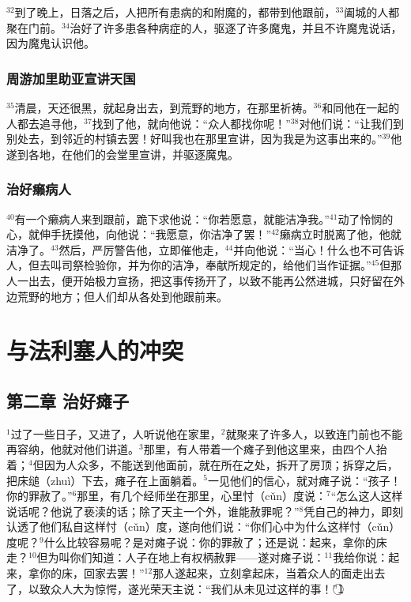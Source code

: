 $^{32}$到了晚上，日落之后，人把所有患病的和附魔的，都带到他跟前，$^{33}$阖城的人都聚在门前。$^{34}$\UL[耶稣]治好了许多患各种病症的人，驱逐了许多魔鬼，并且不许魔鬼说话，因为魔鬼认识他。


\subsubsection{周游加里助亚宣讲天国}
$^{35}$清晨，天还很黑，\UL[耶稣]就起身出去，到荒野的地方，在那里祈祷。$^{36}$\UL[西满]和同他在一起的人都去追寻他，$^{37}$找到了他，就向他说：“众人都找你呢！”$^{38}$\UL[耶稣]对他们说：“让我们到别处去，到邻近的村镇去罢！好叫我也在那里宣讲，因为我是为这事出来的。”$^{39}$他遂到\UL[加里肋亚]各地，在他们的会堂里宣讲，并驱逐魔鬼。


\subsubsection{治好癞病人}
$^{40}$有一个癞病人来到\UL[耶稣]跟前，跪下求他说：“你若愿意，就能洁净我。”$^{41}$\UL[耶稣]动了怜悯的心，就伸手抚摸他，向他说：“我愿意，你洁净了罢！”$^{42}$癞病立时脱离了他，他就洁净了。$^{43}$然后，\UL[耶稣]严厉警告他，立即催他走，$^{44}$并向他说：“当心！什么也不可告诉人，但去叫司祭检验你，并为你的洁净，奉献\UL[梅瑟]所规定的，给他们当作证据。”$^{45}$但那人一出去，便开始极力宣扬，把这事传扬开了，以致\UL[耶稣]不能再公然进城，只好留在外边荒野的地方；但人们却从各处到他跟前来。


\section{与法利塞人的冲突}


\subsection{第二章 治好瘫子}
$^{1}$过了一些日子，\UL[耶稣]又进了\UL[葛法翁]，人听说他在家里，$^{2}$就聚来了许多人，以致连门前也不能再容纳，他就对他们讲道。$^{3}$那里，有人带着一个瘫子到他这里来，由四个人抬着；$^{4}$但因为人众多，不能送到他面前，就在\UL[耶稣]所在之处，拆开了房顶；拆穿之后，把床缒（zhuì）下去，瘫子在上面躺着。$^{5}$\UL[耶稣]一见他们的信心，就对瘫子说：“孩子！你的罪赦了。”$^{6}$那里，有几个经师坐在那里，心里忖（cǔn）度说：$^{7}$“怎么这人这样说话呢？他说了亵渎的话；除了天主一个外，谁能赦罪呢？”$^{8}$\UL[耶稣]凭自己的神力，即刻认透了他们私自这样忖（cǔn）度，遂向他们说：“你们心中为什么这样忖（cǔn）度呢？$^{9}$什么比较容易呢？是对瘫子说：你的罪赦了；还是说：起来，拿你的床走？$^{10}$但为叫你们知道：人子在地上有权柄赦罪——遂对瘫子说：$^{11}$我给你说：起来，拿你的床，回家去罢！”$^{12}$那人遂起来，立刻拿起床，当着众人的面走出去了，以致众人大为惊愕，遂光荣天主说：“我们从未见过这样的事！”\textcircled{1}



